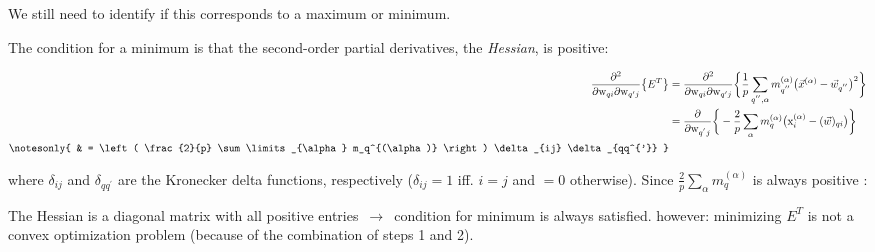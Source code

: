 \begin{frame}

We still need to identify if this corresponds to a maximum or minimum.


The condition for a minimum is that the second-order partial derivatives, the \emph{Hessian}, is positive:

\begin{align}
	\frac{\partial^2}{\partial \mathrm{w}_{qi} \partial \mathrm{w}_{
			q'j}} \big\{ E^T\big\}
	&=
		\frac{\partial^2}{\partial \mathrm{w}_{qi} \partial \mathrm{w}_{
			q'j}} \bigg\{ \frac{1}{p} \sum\limits_{q^{''}, \alpha}
			m_{q^{''}}^{(\alpha)} \big( \vec{x}^{(\alpha)} - \vec{w}_{q^{''}}
			\big)^2 \bigg\} \\
		& = \frac{\partial}{\partial \mathrm{w}_{q^{'}j}} \bigg\{
			-\frac{2}{p} \sum\limits_{\alpha} m_q^{(\alpha)} 
			\big( \mathrm{x}_i^{(\alpha)} - (\vec{w})_{qi}
			\big) \bigg\} \\
\notesonly{
		& = \left( \frac{2}{p} \sum\limits_{\alpha} m_q^{(\alpha)} \right)
			\delta_{ij} \delta_{qq^{'}}
			}
\end{align}
\end{frame}

\begin{frame}

where $\delta_{ij}$ and $\delta_{qq^{'}}$ are the Kronecker delta functions, respectively ($\delta_{ij}=1$ iff. $i=j$ and $=0$ otherwise). 
Since $\frac{2}{p} \sum\limits_{\alpha} m_q^{(\alpha)}$ is always positive :

\begin{itemize}
	 \itR The Hessian is a diagonal matrix with all positive entries $\,\to\,$ condition for minimum is always satisfied.
	 \itR however: minimizing $E^{T}$ is not a convex optimization problem (because of the combination of steps 1 and 2).
\end{itemize} 

\end{frame}

